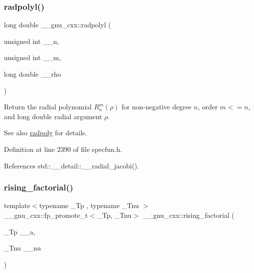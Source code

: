 \subsubsection{\texorpdfstring{radpolyl()}{radpolyl()}}
{\footnotesize\ttfamily long double \+\_\+\+\_\+gnu\+\_\+cxx\+::radpolyl (\begin{DoxyParamCaption}\item[{unsigned int}]{\+\_\+\+\_\+n,  }\item[{unsigned int}]{\+\_\+\+\_\+m,  }\item[{long double}]{\+\_\+\+\_\+rho }\end{DoxyParamCaption})\hspace{0.3cm}{\ttfamily [inline]}}

Return the radial polynomial $ R_n^m(\rho) $ for non-\/negative degree $ n $, order $ m <= n $, and {\ttfamily long double} radial argument $ \rho $.

\begin{DoxySeeAlso}{See also}
\hyperlink{group__gnu__math__spec__func_ga195db2592888b7a8df870d9eaeff8d05}{radpoly} for details. 
\end{DoxySeeAlso}


Definition at line 2390 of file specfun.\+h.



References std\+::\+\_\+\+\_\+detail\+::\+\_\+\+\_\+radial\+\_\+jacobi().

\mbox{\label{group__gnu__math__spec__func_gae8c36a0e1f60254cf212a3806f7c675c}} 
\subsubsection{\texorpdfstring{rising\+\_\+factorial()}{rising\_factorial()}}
{\footnotesize\ttfamily template$<$typename \+\_\+\+Tp , typename \+\_\+\+Tnu $>$ \\
\+\_\+\+\_\+gnu\+\_\+cxx\+::fp\+\_\+promote\+\_\+t$<$\+\_\+\+Tp, \+\_\+\+Tnu$>$ \+\_\+\+\_\+gnu\+\_\+cxx\+::rising\+\_\+factorial (\begin{DoxyParamCaption}\item[{\+\_\+\+Tp}]{\+\_\+\+\_\+a,  }\item[{\+\_\+\+Tnu}]{\+\_\+\+\_\+nu }\end{DoxyParamCaption})\hspace{0.3cm}{\ttfamily [inline]}}



